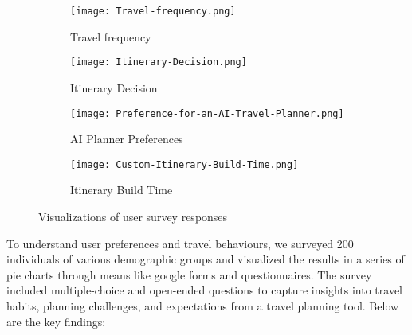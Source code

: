 \documentclass[final,3p,times,authoryear]{elsarticle}
\begin{document}
\begin{figure}[h!]
    \centering
    \begin{subfigure}[b]{0.22\textwidth} %
        \centering
        \texttt{[image: Travel-frequency.png]} %
        \caption{Travel frequency}
        \label{fig:travel-freq}
    \end{subfigure}
    \hfill
    \begin{subfigure}[b]{0.22\textwidth} %
        \centering
        \texttt{[image: Itinerary-Decision.png]} %
        \caption{Itinerary Decision}
        \label{fig:itinerary-dec}
    \end{subfigure}
    \hfill
    \begin{subfigure}[b]{0.22\textwidth} %
        \centering
        \texttt{[image: Preference-for-an-AI-Travel-Planner.png]} %
        \caption{AI Planner Preferences}
        \label{fig:preference-planner}
    \end{subfigure}
    \hfill
    \begin{subfigure}[b]{0.22\textwidth} %
        \centering
        \texttt{[image: Custom-Itinerary-Build-Time.png]} %
        \caption{Itinerary Build Time}
        \label{fig:itinerary-time}
    \end{subfigure}
    \caption{Visualizations of user survey responses}
    \label{fig:1x4-grid-wide}
\end{figure}
    
    To understand user preferences and travel behaviours, we surveyed 200 individuals of various demographic groups and visualized the results in a series of pie charts through means like google forms and questionnaires. The survey included multiple-choice and open-ended questions to capture insights into travel habits, planning challenges, and expectations from a travel planning tool.
    Below are the key findings:
    
\end{document}
